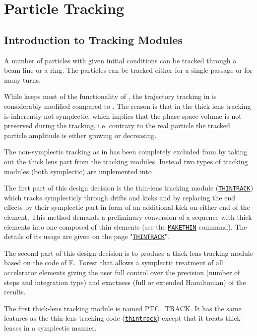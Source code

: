 \chapter{Particle Tracking}
\label{chap:tracking}\label{chap:thintrack}

\section{Introduction to \madx Tracking Modules}
\label{sec:trackintro}

A number of particles with given initial conditions can be tracked
through a beam-line or a ring. The particles can be tracked either for a
single passage or for many turns.  


While \madx keeps most of the functionality of \madeight, the
trajectory tracking in \madx is considerably modified compared to
\madeight. 
The reason is that in \madeight the thick lens tracking is inherently not
symplectic, which implies that the phase space volume is not preserved
during the tracking, i.e. contrary to the real particle the tracked
particle amplitude is either growing or decreasing. 


The non-symplectic tracking as in \madeight has been completely excluded
from \madx by taking out the thick lens part from the tracking
modules. Instead two types of tracking modules (both symplectic) are
implemented into \madx. 


The first part of this design decision is the thin-lens tracking module
(\href{../thintrack/thintrack.html}{\tt THINTRACK})  which tracks
symplecticly through drifts and kicks and by replacing the end effects
by their symplectic part in form of an additional kick on either  end of
the element. This method demands a preliminary conversion of a sequence
with thick elements into one composed of thin elements (see the
\hyperref[chap:makethin]{\tt MAKETHIN} command). The
details of its usage are given on the page
"\href{../thintrack/thintrack.html}{\tt THINTRACK}". 


The second part of this design decision is to produce a thick lens
tracking module based on the \ptc code of E.~Forest that
allows a symplectic treatment of all accelerator elements giving the
user full control over the precision (number of steps and integration
type) and exactness (full or extended Hamiltonian) of the results. 


The first \ptc thick-lens tracking module is named
\hyperref[sec:ptc_track]{PTC\_TRACK}. 
It has the same features as the thin-lens tracking code
({\tt \href{../thintrack/thintrack.html}{thintrack}}) except that it
treats thick-lenses in a symplectic manner. 


